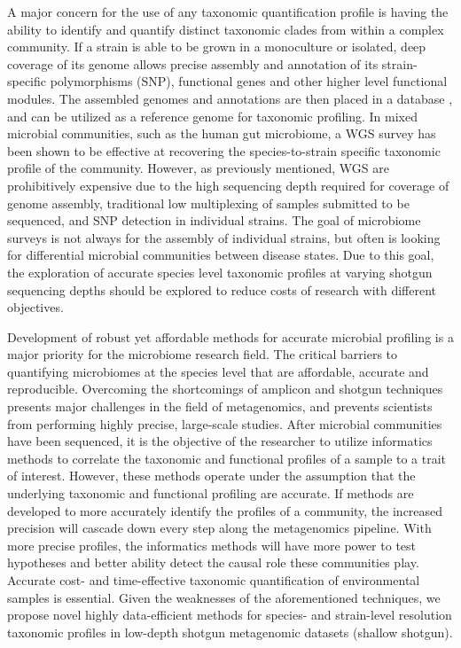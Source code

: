 A major concern for the use of any taxonomic quantification profile is having the ability to identify and quantify distinct taxonomic clades from within a complex community. If a strain is able to be grown in a monoculture or isolated, deep coverage of its genome allows precise assembly and annotation of its strain-specific polymorphisms (SNP), functional genes and other higher level functional modules. The assembled genomes and annotations are then placed in a database \cite{tatusova_refseq_2014}, and can be utilized as a reference genome for taxonomic profiling. In mixed microbial communities, such as the human gut microbiome, a WGS survey has been shown to be effective at recovering the species-to-strain specific taxonomic profile of the community. However, as previously mentioned, WGS are prohibitively expensive due to the high sequencing depth required for coverage of genome assembly, traditional low multiplexing of samples submitted to be sequenced, and SNP detection in individual strains. The goal of microbiome surveys is not always for the assembly of individual strains, but often is looking for differential microbial communities between disease states. Due to this goal, the exploration of accurate species level taxonomic profiles at varying shotgun sequencing depths should be explored to reduce costs of research with different objectives.

Development of robust yet affordable methods for accurate microbial profiling is a major priority for the microbiome research field. The critical barriers to quantifying microbiomes at the species level that are affordable, accurate and reproducible. Overcoming the shortcomings of amplicon and shotgun techniques presents major challenges in the field of metagenomics, and prevents scientists from performing highly precise, large-scale studies. After microbial communities have been sequenced, it is the objective of the researcher to utilize informatics methods to correlate the taxonomic and functional profiles of a sample to a trait of interest. However, these methods operate under the assumption that the underlying taxonomic and functional profiling are accurate. If methods are developed to more accurately identify the profiles of a community, the increased precision will cascade down every step along the metagenomics pipeline. With more precise profiles, the informatics methods will have more power to test hypotheses and better ability detect the causal role these communities play. Accurate cost- and time-effective taxonomic quantification of environmental samples is essential. Given the weaknesses of the aforementioned techniques, we propose novel highly data-efficient methods for species- and strain-level resolution taxonomic profiles in low-depth shotgun metagenomic datasets (shallow shotgun).

